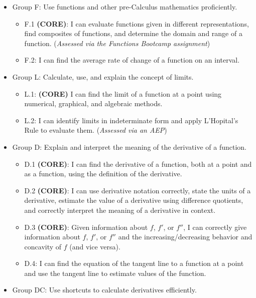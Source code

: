 \documentclass[]{article}
\providecommand{\tightlist}{%
  \setlength{\itemsep}{0pt}\setlength{\parskip}{0pt}}
\begin{document}
\begin{itemize}
\tightlist
\item
  Group F: Use functions and other pre-Calculus mathematics
  proficiently.

  \begin{itemize}
  \tightlist
  \item
    F.1 \textbf{(CORE)}: I can evaluate functions given in different
    representations, find composites of functions, and determine the
    domain and range of a function. (\emph{Assessed via the Functions
    Bootcamp assignment})
  \item
    F.2: I can find the average rate of change of a function on an
    interval.
  \end{itemize}
\item
  Group L: Calculate, use, and explain the concept of limits.

  \begin{itemize}
  \tightlist
  \item
    L.1: \textbf{(CORE)} I can find the limit of a function at a point
    using numerical, graphical, and algebraic methods.
  \item
    L.2: I can identify limits in indeterminate form and apply
    L'Hopital's Rule to evaluate them. (\emph{Assessed via an AEP})
  \end{itemize}
\item
  Group D: Explain and interpret the meaning of the derivative of a
  function.

  \begin{itemize}
  \tightlist
  \item
    D.1 \textbf{(CORE)}: I can find the derivative of a function, both
    at a point and as a function, using the definition of the
    derivative.
  \item
    D.2 \textbf{(CORE)}: I can use derivative notation correctly, state
    the units of a derivative, estimate the value of a derivative using
    difference quotients, and correctly interpret the meaning of a
    derivative in context.
  \item
    D.3 \textbf{(CORE)}: Given information about \(f\), \(f'\), or
    \(f''\), I can correctly give information about \(f\), \(f'\), or
    \(f''\) and the increasing/decreasing behavior and concavity of
    \(f\) (and vice versa).
  \item
    D.4: I can find the equation of the tangent line to a function at a
    point and use the tangent line to estimate values of the function.\\
  \end{itemize}
\item
  Group DC: Use shortcuts to calculate derivatives efficiently.


\end{itemize}
\end{document}
